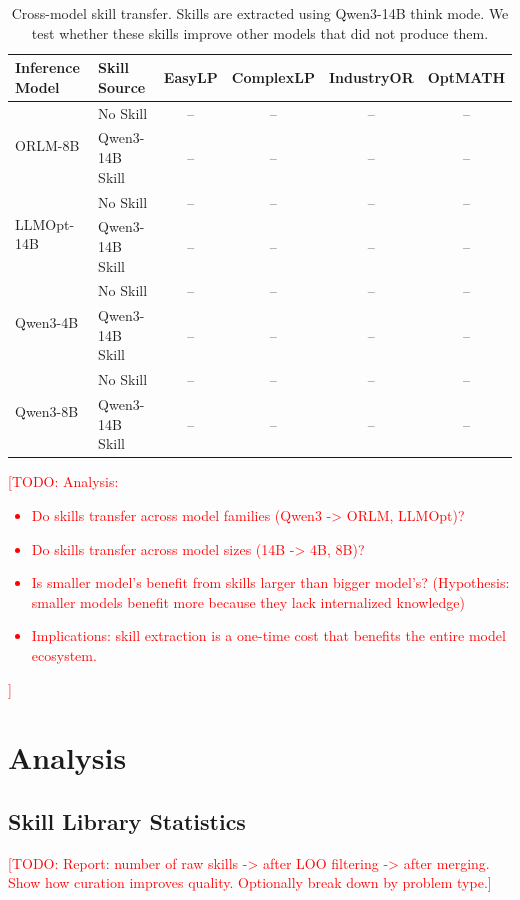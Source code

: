 \documentclass[11pt]{article}
\newcommand{\todo}[1]{\textcolor{red}{[TODO: #1]}}
\begin{document}
\begin{table}[t]
\centering
\caption{Cross-model skill transfer. Skills are extracted using Qwen3-14B think mode. We test whether these skills improve other models that did not produce them.}
\label{tab:transfer}
\small
\begin{tabular}{@{}llcccc@{}}
\toprule
\textbf{Inference Model} & \textbf{Skill Source} & \textbf{EasyLP} & \textbf{ComplexLP} & \textbf{IndustryOR} & \textbf{OptMATH} \\
\midrule
\multirow{2}{*}{ORLM-8B}
  & No Skill       & -- & -- & -- & -- \\
  & Qwen3-14B Skill & -- & -- & -- & -- \\
\midrule
\multirow{2}{*}{LLMOpt-14B}
  & No Skill       & -- & -- & -- & -- \\
  & Qwen3-14B Skill & -- & -- & -- & -- \\
\midrule
\multirow{2}{*}{Qwen3-4B}
  & No Skill       & -- & -- & -- & -- \\
  & Qwen3-14B Skill & -- & -- & -- & -- \\
\midrule
\multirow{2}{*}{Qwen3-8B}
  & No Skill       & -- & -- & -- & -- \\
  & Qwen3-14B Skill & -- & -- & -- & -- \\
\bottomrule
\end{tabular}
\end{table}

\todo{Analysis:
\begin{itemize}
    \item Do skills transfer across model families (Qwen3 -> ORLM, LLMOpt)?
    \item Do skills transfer across model sizes (14B -> 4B, 8B)?
    \item Is smaller model's benefit from skills larger than bigger model's? (Hypothesis: smaller models benefit more because they lack internalized knowledge)
    \item Implications: skill extraction is a one-time cost that benefits the entire model ecosystem.
\end{itemize}
}

\section{Analysis}
\label{sec:analysis}

\subsection{Skill Library Statistics}
\todo{Report: number of raw skills -> after LOO filtering -> after merging. Show how curation improves quality. Optionally break down by problem type.}
\end{document}
